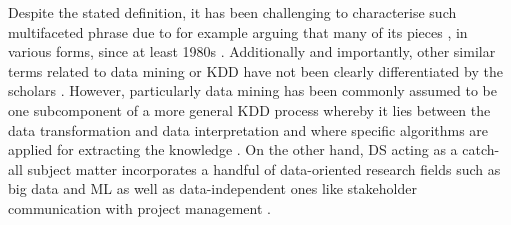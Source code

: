 Despite the stated definition, it has been challenging to characterise such multifaceted phrase due to for example \textcite[443]{AgarwalDhar2014} arguing that many of its pieces , in various forms, since at least 1980s \parencite{LongCao2016}. 
Additionally and importantly, other similar terms related to data mining or \ac{KDD} have not been clearly differentiated by the scholars \parencites{Ayankoya2014}{Provost201351}. 
However, particularly data mining has been commonly assumed to be one subcomponent of a more general \ac{KDD} process whereby it lies between the data transformation and data interpretation and where specific algorithms are applied for extracting the knowledge \parencite{GoebelMichGru1999}. 
On the other hand, \ac{DS} acting as a catch-all subject matter incorporates a handful of data-oriented research fields such as big data and \ac{ML} as well as data-independent ones like stakeholder communication with project management \parencite{LongCao2016}. 
